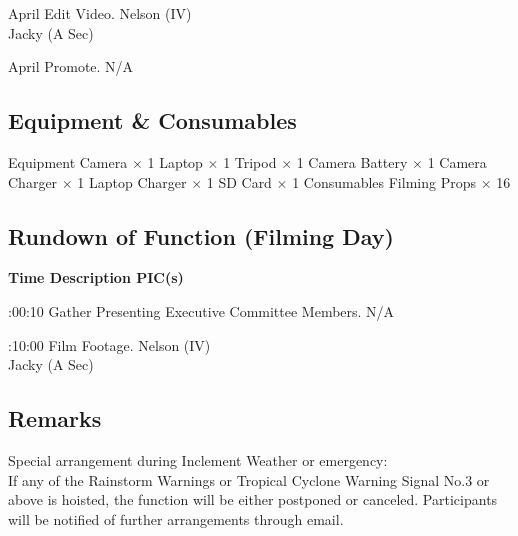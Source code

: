 \bTR{}
\eTD{} April
\eTD\bTD Edit Video.
\eTD\bTD Nelson (IV) \\ Jacky (A Sec)
\eTD\eTR

\bTR{}
\eTD{} April
\eTD\bTD Promote.
\eTD\bTD N/A
\eTD\eTR

\eTABLEbody
\eTABLE

\pagebreak
\subsection{Equipment \& Consumables}
\starttabulate[|l|l|]
\NC{}Equipment\NC\NR
\HL
\NC Camera          \NC $\times$ 1  \NR
\NC Laptop          \NC $\times$ 1  \NR
\NC Tripod          \NC $\times$ 1  \NR
\NC Camera Battery  \NC $\times$ 1  \NR
\NC Camera Charger  \NC $\times$ 1  \NR
\NC Laptop Charger  \NC $\times$ 1  \NR
\NC SD Card         \NC $\times$ 1  \NR
\HL
\NR
\NC{}Consumables\NC\NR
\HL
\NC Filming Props   \NC $\times$ 16 \NR
\HL
\stoptabulate

\subsection{Rundown of Function (Filming Day)}

\setupTABLE[c][1][width=1.25in]
\setupTABLE[c][2][width=3.5in]
\setupTABLE[c][3][width=1.25in]
\bTABLE
\bTABLEhead

\bTR\bTH    \bf{Time}
\eTH\bTH    \bf{Description}
\eTH\bTH    \bf{PIC(s)}
\eTH\eTR

\eTABLEhead
\bTABLEbody

\bTR{}:00:10
\eTD\bTD Gather Presenting Executive Committee Members.
\eTD\bTD N/A
\eTD\eTR

\bTR{}:10:00
\eTD\bTD Film Footage.
\eTD\bTD Nelson (IV) \\ Jacky (A Sec)
\eTD\eTR

\eTABLEbody
\eTABLE

\subsection{Remarks}
\startitemize
\item Special arrangement during Inclement Weather or emergency: \\
If any of the Rainstorm Warnings or Tropical Cyclone Warning Signal No.3 or above is hoisted, the function will be either postponed or canceled. Participants will be notified of further arrangements through email.
\stopitemize

\stopsection
\pagebreak
